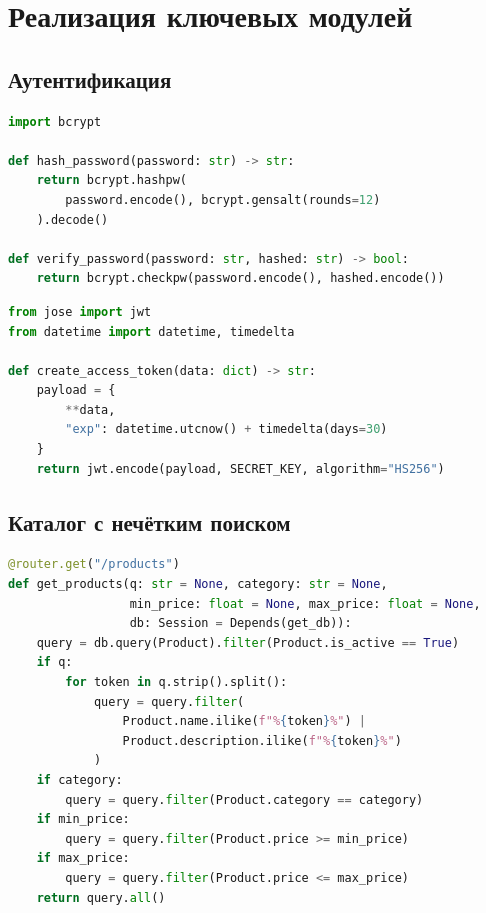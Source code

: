 \documentclass[14pt,a4paper]{extreport}
\begin{document}
\section{Реализация ключевых модулей}

\subsection{Аутентификация}

\begin{lstlisting}[language=Python, caption={Хэширование и проверка пароля}]
import bcrypt

def hash_password(password: str) -> str:
    return bcrypt.hashpw(
        password.encode(), bcrypt.gensalt(rounds=12)
    ).decode()

def verify_password(password: str, hashed: str) -> bool:
    return bcrypt.checkpw(password.encode(), hashed.encode())
\end{lstlisting}

\begin{lstlisting}[language=Python, caption={Генерация JWT-токена}]
from jose import jwt
from datetime import datetime, timedelta

def create_access_token(data: dict) -> str:
    payload = {
        **data,
        "exp": datetime.utcnow() + timedelta(days=30)
    }
    return jwt.encode(payload, SECRET_KEY, algorithm="HS256")
\end{lstlisting}

\subsection{Каталог с нечётким поиском}

\begin{lstlisting}[language=Python, caption={Поиск по каталогу}]
@router.get("/products")
def get_products(q: str = None, category: str = None,
                 min_price: float = None, max_price: float = None,
                 db: Session = Depends(get_db)):
    query = db.query(Product).filter(Product.is_active == True)
    if q:
        for token in q.strip().split():
            query = query.filter(
                Product.name.ilike(f"%{token}%") |
                Product.description.ilike(f"%{token}%")
            )
    if category:
        query = query.filter(Product.category == category)
    if min_price:
        query = query.filter(Product.price >= min_price)
    if max_price:
        query = query.filter(Product.price <= max_price)
    return query.all()
\end{lstlisting}
\end{document}
